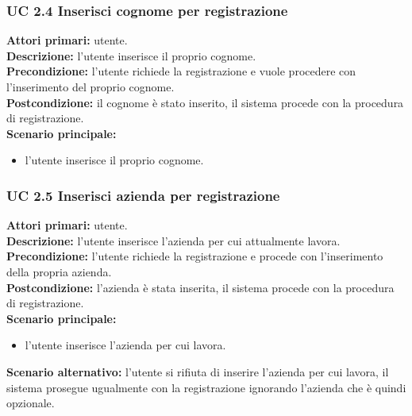 \subsubsection{UC 2.4 Inserisci cognome per registrazione}
\noindent
\textbf{Attori primari:} utente.\\
\textbf{Descrizione:} l'utente inserisce il proprio cognome.\\
\textbf{Precondizione:} l'utente richiede la registrazione e vuole procedere con l'inserimento del proprio cognome.\\
\textbf{Postcondizione:} il cognome è stato inserito, il sistema procede con la procedura di registrazione.\\
\textbf{Scenario principale:}
\begin{itemize}
\item l'utente inserisce il proprio cognome.
\end{itemize}

\subsubsection{UC 2.5 Inserisci azienda per registrazione}
\noindent
\textbf{Attori primari:} utente.\\
\textbf{Descrizione:} l'utente inserisce l'azienda per cui attualmente lavora.\\
\textbf{Precondizione:} l'utente richiede la registrazione e procede con l'inserimento della propria azienda.\\
\textbf{Postcondizione:} l'azienda è stata inserita, il sistema procede con la procedura di registrazione.\\
\textbf{Scenario principale:}
\begin{itemize}
\item l'utente inserisce l'azienda per cui lavora.
\end{itemize}
\textbf{Scenario alternativo:} l'utente si rifiuta di inserire l'azienda per cui lavora, il sistema prosegue ugualmente con la registrazione ignorando l'azienda che è quindi opzionale.\\

